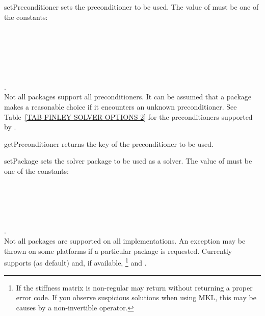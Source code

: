 \begin{methoddesc}[SolverOptions]{setPreconditioner}{}
sets the preconditioner to be used.
The value of  must be one of the constants:\\
 \\
 \\
 \\
 \\
 \\
 \\
 .\\
Not all packages support all preconditioners. It can be assumed that a package
makes a reasonable choice if it encounters an unknown preconditioner.
See Table~\ref{TAB FINLEY SOLVER OPTIONS 2} for the preconditioners supported
by \finley.
\end{methoddesc}
   
\begin{methoddesc}[SolverOptions]{getPreconditioner}{}
returns the key of the preconditioner to be used.
\end{methoddesc}

\begin{methoddesc}[SolverOptions]{setPackage}{}
sets the solver package to be used as a solver.
The value of  must be one of the constants:\\
 \\
 \\
 \\
 \\
 \\
 .\\
Not all packages are supported on all implementations. An exception may be
thrown on some platforms if a particular package is requested.
Currently \finley supports  (as default) and, if
available, \footnote{If the stiffness matrix is
non-regular \MKL may return without returning a proper error code.
If you observe suspicious solutions when using MKL, this may be causes by a
non-invertible operator.} and .
\end{methoddesc}


